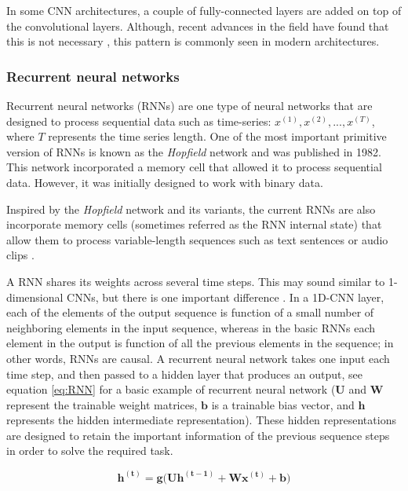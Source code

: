 In some CNN architectures, a couple of fully-connected layers are added on top of the convolutional layers. Although, recent advances in the field have found that this is not necessary \autocite{shelhamer2015}, this pattern is commonly seen in modern architectures.


\subsubsection{Recurrent neural networks}
\sloppy Recurrent neural networks (RNNs) are one type of neural networks that are designed to process sequential data such as time-series: $x^{(1)}, x^{(2)}, ..., x^{(T)}$, where $T$ represents the time series length. One of the most important primitive version of RNNs is known as the \textit{Hopfield} network \autocite{hopfield1982} and was published in 1982. This network incorporated a memory cell that allowed it to process sequential data. However, it was initially designed to work with binary data.

Inspired by the \textit{Hopfield} network and its variants, the current RNNs are also incorporate memory cells (sometimes referred as the RNN internal state) that allow them to process variable-length sequences such as text sentences or audio clips \autocite{haykin1998}.

A RNN shares its weights across several time steps. This may sound similar to 1-dimensional CNNs, but there is one important difference \autocite{Goodfellow2016}. In a 1D-CNN layer, each of the elements of the output sequence is function of a small number of neighboring elements in the input sequence, whereas in the basic RNNs each element in the output is function of all the previous elements in the sequence; in other words, RNNs are causal. A recurrent neural network takes one input each time step, and then passed to a hidden layer that produces an output, see equation \ref{eq:RNN} for a basic example of recurrent neural network ($\mathbf{U}$ and $\mathbf{W}$ represent the trainable weight matrices, $\mathbf{b}$ is a trainable bias vector, and $\mathbf{h}$ represents the hidden intermediate representation). These hidden representations are designed to retain the important information of the previous sequence steps in order to solve the required task.

\begin{equation}
\label{eq:RNN}
\mathbf{h^{( t )}} = \mathbf{g(U h^{( t-1 )}} + \mathbf{W x^{( t )}} + \mathbf{b})
\end{equation}

